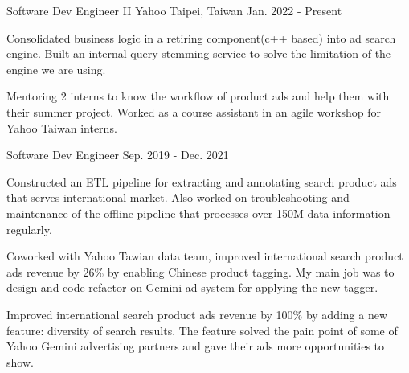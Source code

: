 

\begin{cventries}

  \cventry
    {Software Dev Engineer II} %
    {Yahoo} %
    {Taipei, Taiwan} %
    {Jan. 2022 - Present} %
    {
      \begin{cvitems} %
      \item {Consolidated business logic in a retiring component(c++ based) into ad search engine. Built an internal query stemming service to solve the limitation of the engine we are using.}
        \item {Mentoring 2 interns to know the workflow of product ads and help them with their summer project. Worked as a course assistant in an agile workshop for Yahoo Taiwan interns.}
      \end{cvitems}
    }

  \cventry
    {Software Dev Engineer} %
    {} %
    {} %
    {Sep. 2019 - Dec. 2021} %
    {
      \begin{cvitems} %
        \item {Constructed an ETL pipeline for extracting and annotating search product ads that serves international market. Also worked on troubleshooting and maintenance of the offline pipeline that processes over 150M data information regularly.}
        \item {Coworked with Yahoo Tawian data team, improved international search product ads revenue by 26\% by enabling Chinese product tagging. My main job was to design and code refactor on Gemini ad system for applying the new tagger.}
        \item {Improved international search product ads revenue by 100\% by adding a new feature: diversity of search results. The feature solved the pain point of some of Yahoo Gemini advertising partners and gave their ads more opportunities to show.}
      \end{cvitems}
    }


\end{cventries}
